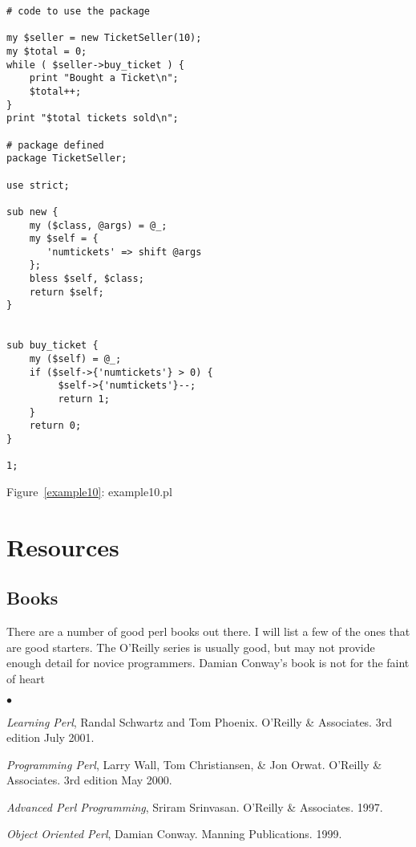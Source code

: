 \documentclass{article}
\begin{document}
\begin{verbatim}
# code to use the package

my $seller = new TicketSeller(10);
my $total = 0;
while ( $seller->buy_ticket ) {
    print "Bought a Ticket\n";
    $total++;
}
print "$total tickets sold\n";

# package defined
package TicketSeller;

use strict;

sub new { 
    my ($class, @args) = @_;
    my $self = {
       'numtickets' => shift @args	
    };
    bless $self, $class;
    return $self;
}


sub buy_ticket {
    my ($self) = @_;
    if ($self->{'numtickets'} > 0) {
         $self->{'numtickets'}--;
         return 1;
    } 
    return 0;
}

1;

\end{verbatim}
\label{example10}
\begin{center}{Figure~\ref{example10}: example10.pl}\end{center}

\newpage
\section{Resources}

\subsection{Books}

\par
There are a number of good perl books out there.  I will list a few of
the ones that are good starters.  The O'Reilly series is usually good,
but may not provide enough detail for novice programmers.  Damian
Conway's book is not for the faint of heart
 
\begin{list}{$ \bullet $}{}
\item {\it Learning Perl}, Randal Schwartz and Tom Phoenix.  O'Reilly
\& Associates. 3rd edition July 2001.

\item {\it Programming Perl}, Larry Wall, Tom Christiansen, \& Jon
Orwat. O'Reilly \& Associates.  3rd edition May 2000.

\item {\it Advanced Perl Programming}, Sriram Srinvasan. O'Reilly \&
Associates. 1997.

\item {\it Object Oriented Perl}, Damian Conway.  Manning
Publications. 1999.  

\end{list}
\end{document}
